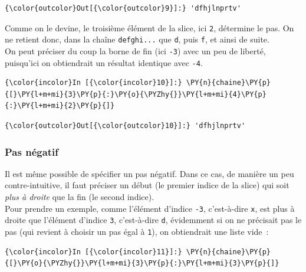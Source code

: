 \begin{Verbatim}[commandchars=\\\{\}]
{\color{outcolor}Out[{\color{outcolor}9}]:} 'dfhjlnprtv'
\end{Verbatim}
            
    Comme on le devine, le troisième élément de la slice, ici \texttt{2},
détermine le pas. On ne retient donc, dans la chaîne \texttt{defghi...}
que \texttt{d}, puis \texttt{f}, et ainsi de suite.\\

On peut préciser du coup la borne de fin (ici \texttt{-3}) avec un peu
de liberté, puisqu'ici on obtiendrait un résultat identique avec
\texttt{-4}.

    \begin{Verbatim}[commandchars=\\\{\}]
{\color{incolor}In [{\color{incolor}10}]:} \PY{n}{chaine}\PY{p}{[}\PY{l+m+mi}{3}\PY{p}{:}\PY{o}{\PYZhy{}}\PY{l+m+mi}{4}\PY{p}{:}\PY{l+m+mi}{2}\PY{p}{]}
\end{Verbatim}


\begin{Verbatim}[commandchars=\\\{\}]
{\color{outcolor}Out[{\color{outcolor}10}]:} 'dfhjlnprtv'
\end{Verbatim}
            
    \hypertarget{pas-nuxe9gatif}{%
\subsubsection{Pas négatif}\label{pas-nuxe9gatif}}

    Il est même possible de spécifier un pas négatif. Dans ce cas, de
manière un peu contre-intuitive, il faut préciser un début (le premier
indice de la slice) qui soit \emph{plus à droite} que la fin (le second
indice).\\

Pour prendre un exemple, comme l'élément d'indice \texttt{-3},
c'est-à-dire \texttt{x}, est plus à droite que l'élément d'indice
\texttt{3}, c'est-à-dire \texttt{d}, évidemment si on ne précisait pas
le pas (qui revient à choisir un pas égal à \texttt{1}), on obtiendrait
une liste vide~:

    \begin{Verbatim}[commandchars=\\\{\}]
{\color{incolor}In [{\color{incolor}11}]:} \PY{n}{chaine}\PY{p}{[}\PY{o}{\PYZhy{}}\PY{l+m+mi}{3}\PY{p}{:}\PY{l+m+mi}{3}\PY{p}{]}
\end{Verbatim}


